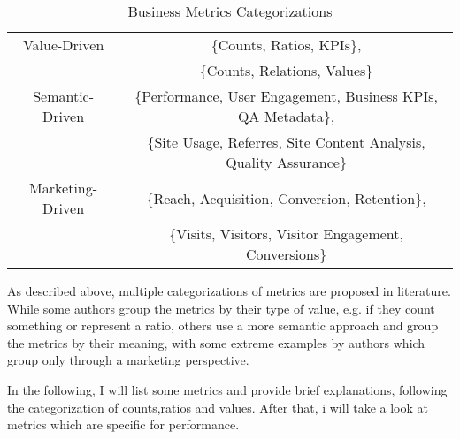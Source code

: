 



\begin{table}[h!]
\begin{center}
\begin{tabular}{  c | c  }
Value-Driven & \{Counts, Ratios, KPIs\},  \\
 & \{Counts, Relations, Values\} \\
\hline
Semantic-Driven & \{Performance, User Engagement, Business KPIs, QA Metadata\},  \\
& \{Site Usage, Referres, Site Content Analysis, Quality Assurance\} \\
\hline
Marketing-Driven & \{Reach, Acquisition, Conversion, Retention\}, \\
& \{Visits, Visitors, Visitor Engagement, Conversions\} \\
\end{tabular}
\caption{Business Metrics Categorizations}
\end{center}
\end{table}




As described above, multiple categorizations of metrics are proposed in literature.
While some authors group the metrics by their type of value, e.g. if they count something or represent a ratio, others use a more semantic approach and group the metrics by their meaning, with some extreme examples by authors which group only through a marketing perspective.

In the following, I will list some metrics and provide brief explanations, following the categorization of counts,ratios and values.
After that, i will take a look at metrics which are specific for performance.








